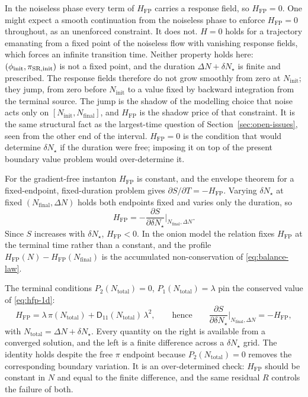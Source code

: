 \documentclass[a4paper,11pt]{article}
\newcommand{\semibold}[1]{{\fontseries{b}\selectfont{#1}}}
\newcommand{\para}[1]{\par\vspace{2mm}\noindent\semibold{{#1.}---}\ignorespaces}
\newenvironment{panel}{\begin{tcolorbox}[enhanced,breakable,colback=gray!10,colframe=gray!30]\small}{\end{tcolorbox}}
\newcommand{\Ny}{N}                          %
\newcommand{\Ninit}{N_{\mathrm{init}}}       %
\newcommand{\Nfinal}{N_{\mathrm{final}}}     %
\newcommand{\DN}{\Delta N}                   %
\newcommand{\dNstar}{\delta N_\star}         %
\newcommand{\field}{\phi}                    %
\newcommand{\mom}{\pi}                       %
\newcommand{\phiinit}{\field_{\mathrm{init}}}
\newcommand{\Dcm}[1]{\mathsf{D}_{#1}}        %
\newcommand{\Hfp}{H_{\mathrm{FP}}}            %
\newcommand{\Ntotal}{N_{\mathrm{total}}}      %
\newcommand{\lag}{\lambda}                   %
\begin{document}
\begin{panel}
\semibold{The vanishing-Hamiltonian expectation, and why it fails.} In the
noiseless phase every term of $\Hfp$ carries a response field, so
$\Hfp=0$. One might expect a smooth continuation from the noiseless phase
to enforce $\Hfp=0$ throughout, as an unenforced constraint. It does not.
$H=0$ holds for a trajectory emanating from a fixed point of the noiseless
flow with vanishing response fields, which forces an infinite transition
time. Neither property holds here: $(\phiinit,\mom_{\rm SR,init})$ is not a
fixed point, and the duration $\DN+\dNstar$ is finite and prescribed. The
response fields therefore do not grow smoothly from zero at $\Ninit$; they
jump, from zero before $\Ninit$ to a value fixed by backward integration
from the terminal source. The jump is the shadow of the modelling choice
that noise acts only on $[\Ninit,\Nfinal]$, and $\Hfp$ is the shadow price
of that constraint. It is the same structural fact as the largest-time
question of Section~\ref{sec:open-issues}, seen from the other end of the
interval. $\Hfp=0$ is the condition that would determine $\dNstar$ if the
duration were free; imposing it on top of the present boundary value
problem would over-determine it.
\end{panel}

For the gradient-free instanton $\Hfp$ is constant, and the envelope
theorem for a fixed-endpoint, fixed-duration problem gives
$\partial S/\partial T=-\Hfp$. Varying $\dNstar$ at fixed $(\Nfinal,\DN)$
holds both endpoints fixed and varies only the duration, so
\begin{equation}
    \Hfp = -\frac{\partial S}{\partial\dNstar}\bigg|_{\Nfinal,\DN} .
    \label{eq:maupertuis}
\end{equation}
Since $S$ increases with $\dNstar$, $\Hfp<0$. In the onion model the
relation fixes $\Hfp$ at the terminal time rather than a constant, and the
profile $\Hfp(\Ny)-\Hfp(\Nfinal)$ is the accumulated non-conservation of
\eqref{eq:balance-law}.

\para{Closed form, gradient-free case} The terminal conditions
$P_2(\Ntotal)=0$, $P_1(\Ntotal)=\lag$ pin the conserved value of
\eqref{eq:hfp-1d}:
\begin{equation}
    \Hfp = \lag\,\mom(\Ntotal) + \Dcm{11}(\Ntotal)\,\lag^2 ,
    \qquad\text{hence}\qquad
    \frac{\partial S}{\partial\dNstar}\bigg|_{\Nfinal,\DN} = -\Hfp ,
    \label{eq:hfp-closed-form}
\end{equation}
with $\Ntotal=\DN+\dNstar$. Every quantity on the right is available from
a converged solution, and the left is a finite difference across a
$\dNstar$ grid. The identity holds despite the free $\mom$ endpoint
because $P_2(\Ntotal)=0$ removes the corresponding boundary variation. It
is an over-determined check: $\Hfp$ should be constant in $\Ny$ and equal
to the finite difference, and the same residual $R$ controls the failure
of both.
\end{document}
